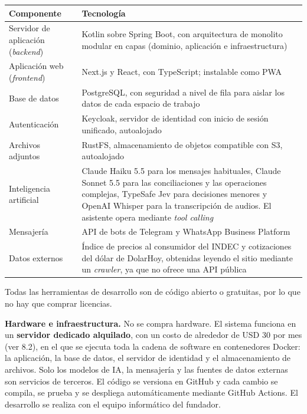 {\def\LTcaptype{none} %
\begin{longtable}[]{@{}
  >{\raggedright\arraybackslash}p{}
  >{\raggedright\arraybackslash}p{}@{}}
\toprule\noalign{}
\begin{minipage}[b]{\linewidth}\raggedright
Componente
\end{minipage} & \begin{minipage}[b]{\linewidth}\raggedright
Tecnología
\end{minipage} \\
\midrule\noalign{}
\endhead
\bottomrule\noalign{}
\endlastfoot
Servidor de aplicación (\emph{backend}) & Kotlin sobre Spring Boot, con
arquitectura de monolito modular en capas (dominio, aplicación e
infraestructura) \\
Aplicación web (\emph{frontend}) & Next.js y React, con TypeScript;
instalable como PWA \\
Base de datos & PostgreSQL, con seguridad a nivel de fila para aislar
los datos de cada espacio de trabajo \\
Autenticación & Keycloak, servidor de identidad con inicio de sesión
unificado, autoalojado \\
Archivos adjuntos & RustFS, almacenamiento de objetos compatible con S3,
autoalojado \\
Inteligencia artificial & Claude Haiku 5.5 para los mensajes habituales,
Claude Sonnet 5.5 para las conciliaciones y las operaciones complejas,
TypeSafe Jev para decisiones menores y OpenAI Whisper para la
transcripción de audios. El asistente opera mediante \emph{tool
calling} \\
Mensajería & API de bots de Telegram y WhatsApp Business Platform \\
Datos externos & Índice de precios al consumidor del INDEC y
cotizaciones del dólar de DolarHoy, obtenidas leyendo el sitio mediante
un \emph{crawler}, ya que no ofrece una API pública \\
\end{longtable}
}

Todas las herramientas de desarrollo son de código abierto o gratuitas,
por lo que no hay que comprar licencias.

\textbf{Hardware e infraestructura.} No se compra hardware. El sistema
funciona en un \textbf{servidor dedicado alquilado}, con un costo de
alrededor de USD 30 por mes (ver 8.2), en el que se ejecuta toda la
cadena de software en contenedores Docker: la aplicación, la base de
datos, el servidor de identidad y el almacenamiento de archivos. Solo
los modelos de IA, la mensajería y las fuentes de datos externas son
servicios de terceros. El código se versiona en GitHub y cada cambio se
compila, se prueba y se despliega automáticamente mediante GitHub
Actions. El desarrollo se realiza con el equipo informático del
fundador.


